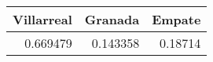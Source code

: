 \begin{tabular}{rrr}
\hline
   Villarreal &   Granada &   Empate \\
\hline
     0.669479 &  0.143358 &  0.18714 \\
\hline
\end{tabular}